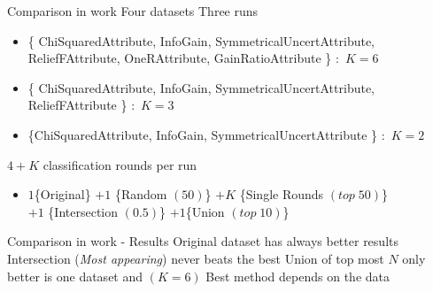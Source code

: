 \begin{frame}{Comparison in work}
\bs
\bi
\mi Four datasets
\mi Three runs
\begin{itemize}
  \item \{ ChiSquaredAttribute, InfoGain,
SymmetricalUncertAttribute, ReliefFAttribute, OneRAttribute, GainRatioAttribute
\} $:$ $K=6$
\item \{ ChiSquaredAttribute, InfoGain,
SymmetricalUncertAttribute, ReliefFAttribute \} $:$ $K=3$
\item \{ChiSquaredAttribute, InfoGain,
SymmetricalUncertAttribute \} $:$ $K=2$
\end{itemize} 
\mi $4 + K$ classification rounds per run
\begin{itemize}
  \item $1$\{Original\} $+1$ \{Random $(50)$\} $+K$
\{Single Rounds $(top \; 50)$\}
\\
$+1$ \{Intersection $(0.5)$\} $+1$\{Union $(top \; 10)$\} 
\end{itemize}
 
\ei

\end{frame}


\begin{frame}{Comparison in work - Results}
\bs
\bi
\mi Original dataset has always better results
\mi Intersection ({\it Most appearing}) never beats the best
\mi Union of top most $N$ only better is one dataset and $(K=6)$
\mi Best method depends on the data
 
\ei

\end{frame}